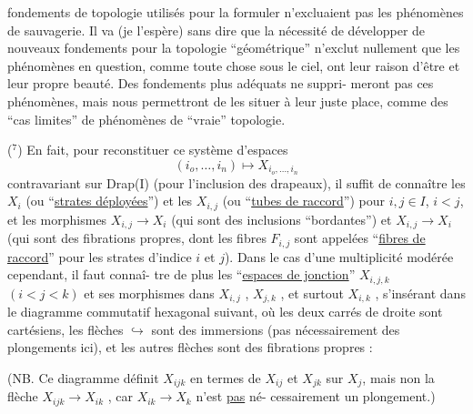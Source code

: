 
fondements de topologie utilisés pour la formuler n'excluaient
pas les phénomènes de sauvagerie. Il va (je l'espère) sans dire
que la nécessité de développer de nouveaux fondements pour la
topologie ``géométrique'' n'exclut nullement que les phénomènes en
question, comme toute chose sous le ciel, ont leur raison d'être
et leur propre beauté. Des fondements plus adéquats ne suppri-%
meront pas ces phénomènes, mais nous permettront de les situer à
leur juste place, comme des ``cas limites'' de phénomènes de ``vraie''
topologie.

($^7$) En fait, pour reconstituer ce système d'espaces
\[ (i_o,\ldots,i_n) \longmapsto X_{i_o,\ldots,i_n} \]
contravariant sur Drap(I) (pour l'inclusion des drapeaux), il
suffit de connaître les $X_i$ (ou ``\uline{strates déployées}'') et les $X_{i,j}$
(ou ``\uline{tubes de raccord}'') pour $i,j \in I$, $i < j$, et les morphismes
$X_{i,j} \longrightarrow X_i$ (qui sont des inclusions ``bordantes'') et $X_{i,j} \longrightarrow X_i$
(qui sont des fibrations propres, dont les fibres $F_{i,j}$ sont
appelées ``\uline{fibres de raccord}'' pour les strates d'indice $i$ et $j$).
Dans le cas d'une multiplicité modérée cependant, il faut connaî-%
tre de plus les ``\uline{espaces de jonction}'' $X_{i,j,k}$ $(i < j < k)$ et ses
morphismes dans $X_{i,j}$ , $X_{j,k}$ , et surtout $X_{i,k}$ , s'insérant dans
le diagramme commutatif hexagonal suivant, où les deux carrés de
droite sont cartésiens, les flèches $\hookrightarrow$ sont des immersions (pas
nécessairement des plongements ici), et les autres flèches sont
des fibrations propres :


(NB. Ce diagramme définit $X_{ijk}$ en termes de $X_{ij}$ et $X_{jk}$ sur $X_j$,
mais non la flèche $X_{ijk} \longrightarrow X_{ik}$ , car $X_{ik} \longrightarrow X_k$ n'est \uline{pas} né-%
cessairement un plongement.)


